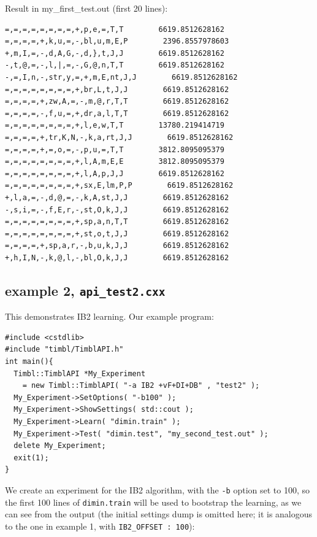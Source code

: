 \documentclass{report}
\begin{document}
Result in my\_first\_test.out (first 20 lines):
\begin{footnotesize}
\begin{verbatim}
=,=,=,=,=,=,=,=,+,p,e,=,T,T        6619.8512628162
=,=,=,=,+,k,u,=,-,bl,u,m,E,P        2396.8557978603
+,m,I,=,-,d,A,G,-,d,},t,J,J        6619.8512628162
-,t,@,=,-,l,|,=,-,G,@,n,T,T        6619.8512628162
-,=,I,n,-,str,y,=,+,m,E,nt,J,J        6619.8512628162
=,=,=,=,=,=,=,=,+,br,L,t,J,J        6619.8512628162
=,=,=,=,+,zw,A,=,-,m,@,r,T,T        6619.8512628162
=,=,=,=,-,f,u,=,+,dr,a,l,T,T        6619.8512628162
=,=,=,=,=,=,=,=,+,l,e,w,T,T        13780.219414719
=,=,=,=,+,tr,K,N,-,k,a,rt,J,J        6619.8512628162
=,=,=,=,+,=,o,=,-,p,u,=,T,T        3812.8095095379
=,=,=,=,=,=,=,=,+,l,A,m,E,E        3812.8095095379
=,=,=,=,=,=,=,=,+,l,A,p,J,J        6619.8512628162
=,=,=,=,=,=,=,=,+,sx,E,lm,P,P        6619.8512628162
+,l,a,=,-,d,@,=,-,k,A,st,J,J        6619.8512628162
-,s,i,=,-,f,E,r,-,st,O,k,J,J        6619.8512628162
=,=,=,=,=,=,=,=,+,sp,a,n,T,T        6619.8512628162
=,=,=,=,=,=,=,=,+,st,o,t,J,J        6619.8512628162
=,=,=,=,+,sp,a,r,-,b,u,k,J,J        6619.8512628162
+,h,I,N,-,k,@,l,-,bl,O,k,J,J        6619.8512628162
\end{verbatim}
\end{footnotesize}
\clearpage

\subsection{example 2, {\tt api\_test2.cxx}}

This demonstrates IB2 learning. Our example program:

\begin{footnotesize}
\begin{verbatim}
#include <cstdlib>
#include "timbl/TimblAPI.h"
int main(){
  Timbl::TimblAPI *My_Experiment
    = new Timbl::TimblAPI( "-a IB2 +vF+DI+DB" , "test2" );
  My_Experiment->SetOptions( "-b100" );
  My_Experiment->ShowSettings( std::cout );
  My_Experiment->Learn( "dimin.train" );
  My_Experiment->Test( "dimin.test", "my_second_test.out" );
  delete My_Experiment;
  exit(1);
}
\end{verbatim}
\end{footnotesize}

We create an experiment for the IB2 algorithm, with the {\tt -b} option set
to 100, so the first 100 lines of {\tt dimin.train} will be used to
bootstrap the learning, as we can see from the output (the initial
settings dump is omitted here; it is analogous to the one in example
1, with {\tt IB2\_OFFSET : 100}):
\end{document}
